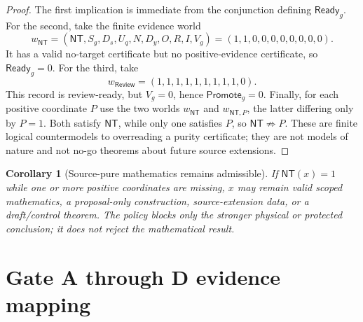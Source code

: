 \documentclass[11pt]{article}
\newtheorem{corollary}{Corollary}
\newcommand{\NT}{\mathsf{NT}}
\newcommand{\Ready}{\mathsf{Ready}}
\newcommand{\Review}{\mathsf{Review}}
\newcommand{\Promote}{\mathsf{Promote}}
\begin{document}
\begin{proof}
The first implication is immediate from the conjunction defining
$\Ready_g$.  For the second, take the finite evidence world
\[
 w_{\NT}=(\NT,S_g,D_s,U_q,N,D_y,O,R,I,V_g)
        =(1,1,0,0,0,0,0,0,0,0).
\]
It has a valid no-target certificate but no positive-evidence certificate, so
$\Ready_g=0$.  For the third, take
\[
 w_{\Review}=(1,1,1,1,1,1,1,1,1,0).
\]
This record is review-ready, but $V_g=0$, hence $\Promote_g=0$.  Finally, for
each positive coordinate $P$ use the two worlds $w_{\NT}$ and
$w_{\NT,P}$, the latter differing only by $P=1$.  Both satisfy $\NT$, while
only one satisfies $P$, so $\NT\not\Rightarrow P$.  These are finite logical
countermodels to overreading a purity certificate; they are not models of
nature and not no-go theorems about future source extensions.
\end{proof}

\begin{corollary}[Source-pure mathematics remains admissible]
If $\NT(x)=1$ while one or more positive coordinates are missing, $x$ may
remain valid scoped mathematics, a proposal-only construction, source-extension
data, or a draft/control theorem.  The policy blocks only the stronger physical
or protected conclusion; it does not reject the mathematical result.
\end{corollary}

\section{Gate A through D evidence mapping}
\end{document}
